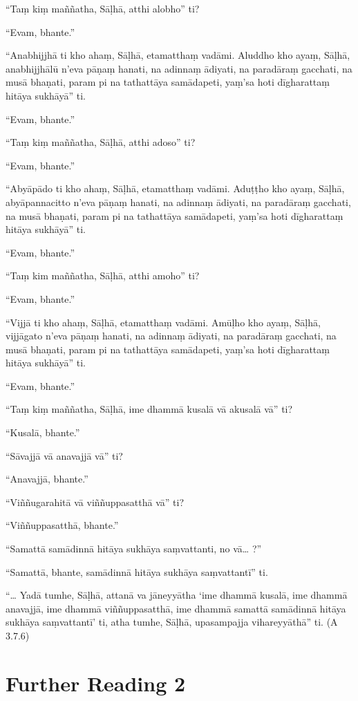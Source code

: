 “Taṃ kiṃ maññatha, Sāḷhā, atthi alobho” ti?

“Evam, bhante.”

“Anabhijjhā ti kho ahaṃ, Sāḷhā, etamatthaṃ vadāmi. Aluddho kho ayaṃ, Sāḷhā, anabhijjhālū n’eva pāṇaṃ hanati, na adinnaṃ ādiyati, na paradāraṃ gacchati, na musā bhaṇati, param pi na tathattāya samādapeti, yaṃ’sa hoti dīgharattaṃ hitāya sukhāyā” ti.

“Evam, bhante.”

“Taṃ kiṃ maññatha, Sāḷhā, atthi adoso” ti?

“Evam, bhante.”

“Abyāpādo ti kho ahaṃ, Sāḷhā, etamatthaṃ vadāmi. Aduṭṭho kho ayaṃ, Sāḷhā, abyāpannacitto n’eva pāṇaṃ hanati, na adinnaṃ ādiyati, na paradāraṃ gacchati, na musā bhaṇati, param pi na tathattāya samādapeti, yaṃ’sa hoti dīgharattaṃ hitāya sukhāyā” ti.

“Evam, bhante.”

“Taṃ kim maññatha, Sāḷhā, atthi amoho” ti?

“Evam, bhante.”

“Vijjā ti kho ahaṃ, Sāḷhā, etamatthaṃ vadāmi. Amūḷho kho ayaṃ, Sāḷhā, vijjāgato n’eva pāṇaṃ hanati, na adinnaṃ ādiyati, na paradāraṃ gacchati, na musā bhaṇati, param pi na tathattāya samādapeti, yaṃ’sa hoti dīgharattaṃ hitāya sukhāyā” ti.

“Evam, bhante.”

“Taṃ kiṃ maññatha, Sāḷhā, ime dhammā kusalā vā akusalā vā” ti?

“Kusalā, bhante.”

“Sāvajjā vā anavajjā vā” ti?

“Anavajjā, bhante.”

“Viññugarahitā vā viññuppasatthā vā” ti?

“Viññuppasatthā, bhante.”

“Samattā samādinnā hitāya sukhāya saṃvattanti, no vā… ?”

“Samattā, bhante, samādinnā hitāya sukhāya saṃvattantī” ti.

“… Yadā tumhe, Sāḷhā, attanā va jāneyyātha ‘ime dhammā kusalā, ime dhammā anavajjā, ime dhammā viññuppasatthā, ime dhammā samattā samādinnā hitāya sukhāya saṃvattantī’ ti, atha tumhe, Sāḷhā, upasampajja vihareyyāthā” ti. \hfill(A 3.7.6)

\section*{Further Reading 2}

